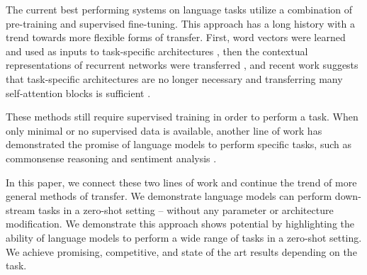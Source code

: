 \documentclass{article}
\begin{document}
The current best performing systems on language tasks utilize a combination of pre-training and supervised fine-tuning. This approach has a long history with a trend towards more flexible forms of transfer. First, word vectors were learned and used as inputs to task-specific architectures \cite{mikolov2013distributed} \cite{collobert2011natural}, then the contextual representations of recurrent networks were transferred \cite{dai2015semi} \cite{peters2018deep}, and recent work suggests that task-specific architectures are no longer necessary and transferring many self-attention blocks is sufficient \cite{radford2018improving} \cite{devlin2018bert}.


These methods still require supervised training in order to perform a task. When only minimal or no supervised data is available, another line of work has demonstrated the promise of language models to perform specific tasks, such as commonsense reasoning \cite{schwartz2017story} and sentiment analysis \cite{radford2017learning}.

In this paper, we connect these two lines of work and continue the trend of more general methods of transfer. We demonstrate language models can perform down-stream tasks in a zero-shot setting -- without any parameter or architecture modification. We demonstrate this approach shows potential by highlighting the ability of language models to perform a wide range of tasks in a zero-shot setting. We achieve promising, competitive, and state of the art results depending on the task.


\end{document}
